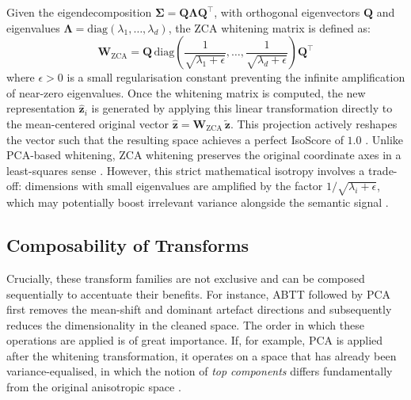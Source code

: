 Given the eigendecomposition $\boldsymbol{\Sigma} = \mathbf{Q} \boldsymbol{\Lambda} \mathbf{Q}^\top$, with orthogonal eigenvectors $\mathbf{Q}$ and eigenvalues $\boldsymbol{\Lambda} = \text{diag}(\lambda_1, \dots, \lambda_d)$, the \ac{ZCA} whitening matrix is defined as:
\begin{equation}
    \mathbf{W}_{\text{ZCA}} = \mathbf{Q}\, \text{diag}\!\left( \frac{1}{\sqrt{\lambda_1 + \epsilon}}, \dots, \frac{1}{\sqrt{\lambda_d + \epsilon}} \right) \mathbf{Q}^\top
    \label{eq:zca}
\end{equation}
where $\epsilon > 0$ is a small regularisation constant preventing the infinite amplification of near-zero eigenvalues. Once the whitening matrix is computed, the new representation $\hat{\mathbf{z}}_i$ is generated by applying this linear transformation directly to the mean-centered original vector $\hat{\mathbf{z}} = \mathbf{W}_{\text{ZCA}}\,\tilde{\mathbf{z}}$. This projection actively reshapes the vector such that the resulting space achieves a perfect IsoScore of $1.0$ \cite{su2021whitening}. Unlike \ac{PCA}-based whitening, \ac{ZCA} whitening preserves the original coordinate axes in a least-squares sense \cite{kessy2018optimal}. However, this strict mathematical isotropy involves a trade-off: dimensions with small eigenvalues are amplified by the factor $1/\sqrt{\lambda_i + \epsilon}$, which may potentially boost irrelevant variance alongside the semantic signal \cite{huang2021whiteningbert,raunak_2019effective}.


\subsection{Composability of Transforms}
\label{sec:theory_composability}


Crucially, these transform families are not exclusive and can be composed sequentially to accentuate their benefits. For instance, \ac{ABTT} followed by \ac{PCA} first removes the mean-shift and dominant artefact directions and subsequently reduces the dimensionality in the cleaned space. The order in which these operations are applied is of great importance. If, for example, \ac{PCA} is applied after the whitening transformation, it operates on a space that has already been variance-equalised, in which the notion of \emph{top components} differs fundamentally from the original anisotropic space \cite{raunak_2019effective, su2021whitening}.

